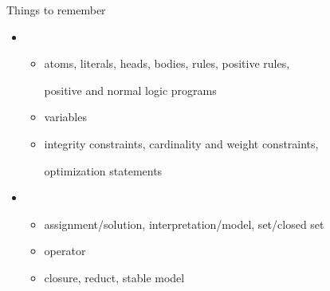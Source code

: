 \begin{frame}{Things to remember}
  \bigskip
  \begin{itemize}\normalsize
  \item {}
    \begin{itemize}
    \item atoms, literals, heads, bodies, rules, positive rules,

      positive and normal logic programs
    \item variables
    \item integrity constraints, cardinality and weight constraints,

      optimization statements
    \end{itemize}
  \bigskip
  \item {}
    \begin{itemize}\normalsize
    \item assignment/solution, interpretation/model, set/closed set
    \item {} operator
    \item closure, reduct, \alert{stable model}
    \end{itemize}
  \end{itemize}
\end{frame}
